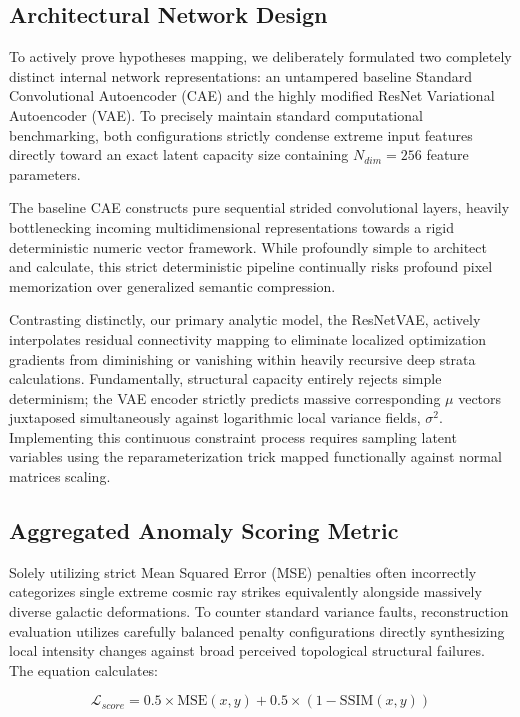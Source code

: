 \documentclass[conference]{IEEEtran}
\begin{document}
\subsection{Architectural Network Design}
To actively prove hypotheses mapping, we deliberately formulated two completely distinct internal network representations: an untampered baseline Standard Convolutional Autoencoder (CAE) and the highly modified ResNet Variational Autoencoder (VAE). To precisely maintain standard computational benchmarking, both configurations strictly condense extreme input features directly toward an exact latent capacity size containing $N_{dim} = 256$ feature parameters.

The baseline CAE constructs pure sequential strided convolutional layers, heavily bottlenecking incoming multidimensional representations towards a rigid deterministic numeric vector framework. While profoundly simple to architect and calculate, this strict deterministic pipeline continually risks profound pixel memorization over generalized semantic compression. 

Contrasting distinctly, our primary analytic model, the ResNetVAE, actively interpolates residual connectivity mapping to eliminate localized optimization gradients from diminishing or vanishing within heavily recursive deep strata calculations. Fundamentally, structural capacity entirely rejects simple determinism; the VAE encoder strictly predicts massive corresponding $\mu$ vectors juxtaposed simultaneously against logarithmic local variance fields, $\sigma^{2}$. Implementing this continuous constraint process requires sampling latent variables using the reparameterization trick mapped functionally against normal matrices scaling.

\subsection{Aggregated Anomaly Scoring Metric}
Solely utilizing strict Mean Squared Error (MSE) penalties often incorrectly categorizes single extreme cosmic ray strikes equivalently alongside massively diverse galactic deformations. To counter standard variance faults, reconstruction evaluation utilizes carefully balanced penalty configurations directly synthesizing local intensity changes against broad perceived topological structural failures. The equation calculates:

\begin{equation}
    \mathcal{L}_{score} = 0.5 \times \text{MSE}(x,y) + 0.5 \times (1 - \text{SSIM}(x,y))
\end{equation}
\end{document}
